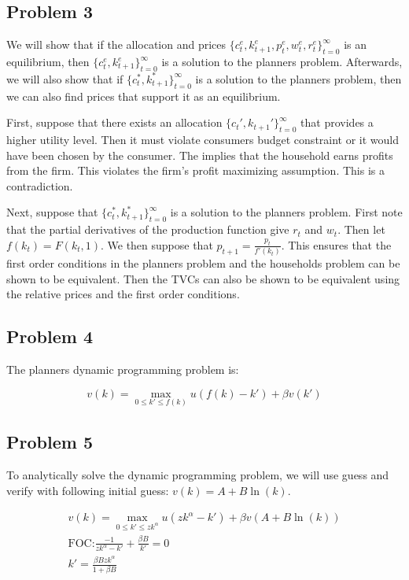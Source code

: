\documentclass[12pt]{article}
\begin{document}
\subsection*{Problem 3}

We will show that if the allocation and prices $ \{c_t^e, k_{t+1}^e, p_t^e, w_t^e, r_t^e \}_{t=0}^\infty $ is an 
equilibrium, then $\{c_t^e, k_{t+1}^e \}_{t=0}^\infty $ is a solution to the planners problem. Afterwards, we will also show
that if $\{c_t^*, k_{t+1}^* \}_{t=0}^\infty $ is a solution to the planners problem, then we can also find prices that 
support it as an equilibrium. 

First, suppose that there exists an allocation $\{c_t', k_{t+1}' \}_{t=0}^\infty $ that provides a higher utility level. 
Then it must violate consumers budget constraint or it would have been chosen by the consumer. The implies that the household 
earns profits from the firm. This violates the firm's profit maximizing assumption. This is a contradiction. 

Next, suppose that $\{c_t^*, k_{t+1}^* \}_{t=0}^\infty $ is a solution to the planners problem. First note that the partial
derivatives of the production function give $r_t$ and $w_t$. Then let $f(k_t) = F(k_t, 1)$. We then suppose that 
$p_{t+1} = \frac{p_t}{f'(k_t)}$. This ensures that the first order conditions in the planners problem and the households
problem can be shown to be equivalent. Then the TVCs can also be shown to be equivalent using the relative prices and the 
first order conditions. 

\subsection*{Problem 4}

The planners dynamic programming problem is: 

\begin{equation*}
    v(k) = \max_{0 \leq k' \leq f(k)} u(f(k) - k') + \beta v(k')
\end{equation*}

\subsection*{Problem 5}

To analytically solve the dynamic programming problem, we will use guess and verify with following initial guess:
$v(k) = A + B \ln(k)$. 

\begin{gather*}
    v(k) = \max_{0 \leq k' \leq zk^\alpha} u(zk^\alpha - k') + \beta v(A + B \ln(k)) \\
    \text{FOC:} \frac{-1}{zk^\alpha - k'} + \frac{\beta B}{k'} = 0 \\
    k' = \frac{\beta B z k^\alpha}{1 + \beta B} \\
\end{gather*}
\end{document}
